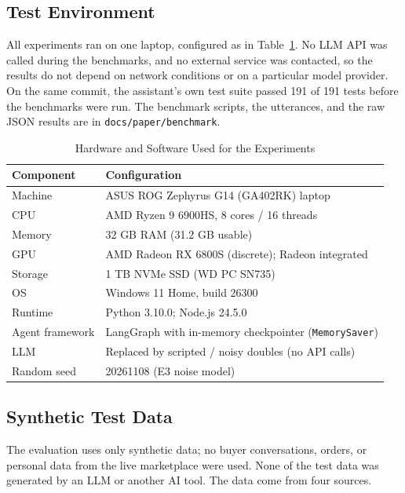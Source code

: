 \documentclass{IEEEtran}
\newcommand{\code}[1]{\texttt{\small #1}}
\begin{document}
\subsection{Test Environment}

All experiments ran on one laptop, configured as in Table~\ref{tab:env}. No LLM API was called during the benchmarks, and no external service was contacted, so the results do not depend on network conditions or on a particular model provider. On the same commit, the assistant's own test suite passed 191 of 191 tests before the benchmarks were run. The benchmark scripts, the utterances, and the raw JSON results are in \code{docs/paper/benchmark}.

\begin{table}[t]
\caption{Hardware and Software Used for the Experiments}
\label{tab:env}
\centering
\footnotesize
\setlength{\tabcolsep}{4pt}
\begin{tabular}{@{}p{20mm}p{60mm}@{}}
\toprule
Component & Configuration \\
\midrule
Machine & ASUS ROG Zephyrus G14 (GA402RK) laptop \\
CPU & AMD Ryzen 9 6900HS, 8 cores / 16 threads \\
Memory & 32 GB RAM (31.2 GB usable) \\
GPU & AMD Radeon RX 6800S (discrete); Radeon integrated \\
Storage & 1 TB NVMe SSD (WD PC SN735) \\
OS & Windows 11 Home, build 26300 \\
Runtime & Python 3.10.0; Node.js 24.5.0 \\
Agent framework & LangGraph with in-memory checkpointer (\code{MemorySaver}) \\
LLM & Replaced by scripted / noisy doubles (no API calls) \\
Random seed & 20261108 (E3 noise model) \\
\bottomrule
\end{tabular}
\end{table}

\subsection{Synthetic Test Data}

The evaluation uses only synthetic data; no buyer conversations, orders, or personal data from the live marketplace were used. None of the test data was generated by an LLM or another AI tool. The data come from four sources.
\end{document}
